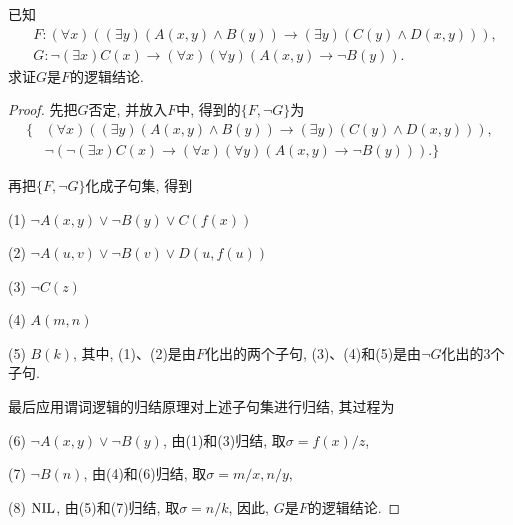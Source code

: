 \begin{example}
已知
\begin{align}
 &F:  (\forall x)((\exists  y)(A(x, y)\wedge B(y))\rightarrow (\exists  y)(C(y)\wedge D(x, y))),\\
 &G: \neg (\exists  x)C(x)\rightarrow (\forall x)(\forall y)(A(x, y)\rightarrow \neg B(y)).
\end{align}
求证$G$是$F$的逻辑结论.
\end{example}
\begin{proof}
先把$G$否定, 并放入$F$中, 得到的$\{F, \neg G\}$为
\begin{align}
  \{
    &(\forall  x)((\exists   y)(A(x,y)\wedge B(y))\rightarrow (\exists   y)(C(y)\wedge D(x,y))),\\
    &\neg (\neg (\exists   x)C(x)\rightarrow (\forall  x)(\forall  y)(A(x,y)\rightarrow \neg  B(y))).
     \}
\end{align}

再把$\{F,\neg G\}$化成子句集, 得到

     (1) $\neg A(x,y)\vee \neg  B(y) \vee C(f(x))$

     (2) $\neg  A(u,v)\vee \neg  B(v) \vee D(u,f(u))$

     (3) $\neg  C(z)$

     (4)  $A(m,n)$

     (5)  $B(k)$, 其中, (1)、(2)是由$F$化出的两个子句, (3)、(4)和(5)是由$\neg G$化出的3个子句.

最后应用谓词逻辑的归结原理对上述子句集进行归结, 其过程为

     (6) $\neg  A(x,y)\vee  \neg  B(y)$, 由(1)和(3)归结, 取$\sigma={f(x)/z}$,

     (7) $\neg  B(n)$, 由(4)和(6)归结, 取$\sigma ={m/x,n/y}$,

     (8) $\textup{NIL}$, 由(5)和(7)归结, 取$\sigma={n/k}$, 因此, $G$是$F$的逻辑结论.
\end{proof}

